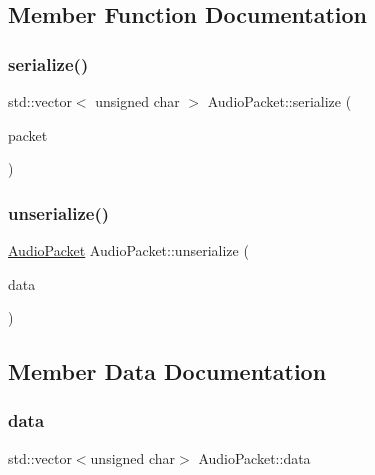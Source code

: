\subsection{Member Function Documentation}
\mbox{\label{structAudioPacket_a9ce79c4bf226482d30e4ad0e7f51e72d}} 
\subsubsection{\texorpdfstring{serialize()}{serialize()}}
{\footnotesize\ttfamily std\+::vector$<$ unsigned char $>$ Audio\+Packet\+::serialize (\begin{DoxyParamCaption}\item[{const \mbox{\hyperlink{structAudioPacket}{Audio\+Packet}} \&}]{packet }\end{DoxyParamCaption})\hspace{0.3cm}{\ttfamily [static]}}

\mbox{\label{structAudioPacket_a385f44125b043e727f75a9a88435bfbd}} 
\subsubsection{\texorpdfstring{unserialize()}{unserialize()}}
{\footnotesize\ttfamily \mbox{\hyperlink{structAudioPacket}{Audio\+Packet}} Audio\+Packet\+::unserialize (\begin{DoxyParamCaption}\item[{std\+::vector$<$ unsigned char $>$ \&}]{data }\end{DoxyParamCaption})\hspace{0.3cm}{\ttfamily [static]}}



\subsection{Member Data Documentation}
\mbox{\label{structAudioPacket_ac307e1b3c16bc07222501fc6fae3bc00}} 
\subsubsection{\texorpdfstring{data}{data}}
{\footnotesize\ttfamily std\+::vector$<$unsigned char$>$ Audio\+Packet\+::data}

